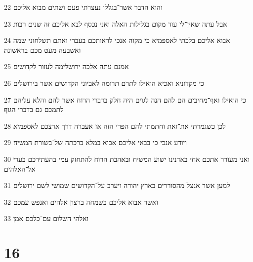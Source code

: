 \par 22 והוא הדבר אשר־בגללו נעצרתי פעם ושתים מבוא אליכם׃
\par 23 אבל עתה שאין־לי עוד מקום בגלילות האלה ואני נכסף לבא אליכם זה שנים רבות׃
\par 24 אבוא אליכם בלכתי לאספמיא כי מקוה אנכי לראותכם בעברי ואתם תשלחוני שמה ואשבעה מעט מכם בראשונה׃
\par 25 אמנם עתה אלכה ירושלימה לעזור לקדושים׃
\par 26 כי מקדוניא ואכיא הואילו לתרם תרומה לאביוני הקדושים אשר בירושלים׃
\par 27 כי הואילו ואף־מחיבים הם להם הנה לגוים היה חלק בדברי הרוח אשר להם והלא עליהם לתמכם גם בדברי הגוף׃
\par 28 לכן כשגמרתי את־זאת וחתמתי להם הפרי הזה אז אעברה דרך ארצכם לאספמיא׃
\par 29 ויודע אנכי כי בבאי אליכם אבוא במלא ברכתה של־בשורת המשיח׃
\par 30 ואני מעורר אתכם אחי באדנינו ישוע המשיח ובאהבת הרוח להתחזק עמי בהעתירכם בעדי אל־האלהים׃
\par 31 למען אשר אנצל מהסוררים בארץ יהודה ויערב על־הקדושים שמושי לשם ירושלים׃
\par 32 ואשר אבוא אליכם בשמחה ברצון אלהים ואנפש עמכם׃
\par 33 ואלהי השלום עם־כלכם אמן׃

\chapter{16}

